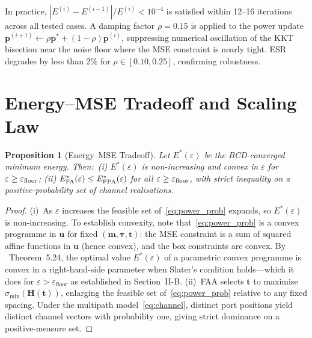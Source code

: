 \documentclass[journal,letterpaper,10pt,twocolumn]{IEEEtran}
\newtheorem{proposition}{Proposition}
\begin{document}
In practice, $|E^{(i)}-E^{(i-1)}|/E^{(i)}\!<\!10^{-4}$ is satisfied
within 12--16 iterations across all tested cases. A damping factor
$\rho\!=\!0.15$ is applied to the power update
$\mathbf{p}^{(i+1)}\!\leftarrow\!\rho\mathbf{p}^{*}\!+\!(1\!-\!\rho)\mathbf{p}^{(i)}$,
suppressing numerical oscillation of the KKT bisection near the noise
floor where the MSE constraint is nearly tight. ESR degrades by less
than 2\% for $\rho\!\in\![0.10,0.25]$, confirming robustness.

\section{Energy--MSE Tradeoff and Scaling Law}

\begin{proposition}[Energy--MSE Tradeoff]
Let $E^{*}(\varepsilon)$ be the BCD-converged minimum energy.
Then:~(i) $E^{*}(\varepsilon)$ is non-increasing and convex in
$\varepsilon$ for $\varepsilon\geq\varepsilon_{\textup{floor}}$;
(ii) $E^{*}_{\textup{FA}}(\varepsilon)\leq E^{*}_{\textup{FPA}}(\varepsilon)$
for all $\varepsilon\geq\varepsilon_{\textup{floor}}$, with strict
inequality on a positive-probability set of channel realisations.
\end{proposition}
\begin{proof}
(i)~As $\varepsilon$ increases the feasible set of~\eqref{eq:power_prob}
expands, so $E^{*}(\varepsilon)$ is non-increasing. To establish
convexity, note that~\eqref{eq:power_prob} is a convex programme in
$\mathbf{u}$ for fixed $(\mathbf{m},\boldsymbol{\tau},\mathbf{t})$: the
MSE constraint is a sum of squared affine functions in $\mathbf{u}$
(hence convex), and the box constraints are convex. By
\cite{Boyd2004}~Theorem~5.24, the optimal value $E^{*}(\varepsilon)$ of
a parametric convex programme is convex in a right-hand-side parameter
when Slater's condition holds---which it does for
$\varepsilon\!>\!\varepsilon_{\text{floor}}$ as established in
Section~II-B. (ii)~FAA selects $\mathbf{t}$ to maximise
$\sigma_{\min}(\mathbf{H}(\mathbf{t}))$, enlarging the feasible set
of~\eqref{eq:power_prob} relative to any fixed spacing. Under the
multipath model~\eqref{eq:channel}, distinct port positions yield
distinct channel vectors with probability one, giving strict dominance
on a positive-measure set.
\end{proof}
\end{document}
